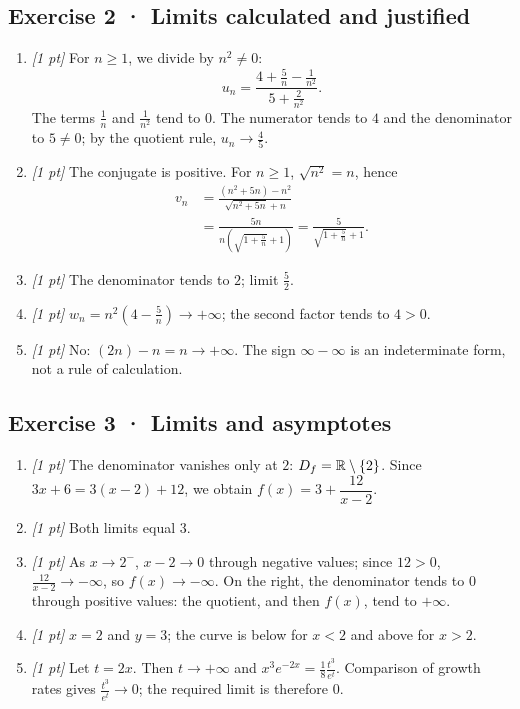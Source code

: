 \subsection*{Exercise 2 · Limits calculated and justified}\begin{enumerate}

\item \textit{[1 pt]} For $n\ge1$, we divide by $n^2\ne0$:
\[u_n=\frac{4+\frac{5}{n}-\frac{1}{n^2}}{5+\frac{2}{n^2}}.\]
The terms $\frac{1}{n}$ and $\frac{1}{n^2}$ tend to $0$. The numerator tends to $4$ and the denominator to $5\ne0$; by the quotient rule, $u_n\to\frac{4}{5}$.

\item \textit{[1 pt]} The conjugate is positive. For $n\ge1$, $\sqrt{n^2}=n$, hence
\[\begin{aligned}v_n&=\frac{(n^2+5n)-n^2}{\sqrt{n^2+5n}+n}\\&=\frac{5n}{n(\sqrt{1+\frac{5}{n}}+1)}=\frac{5}{\sqrt{1+\frac{5}{n}}+1}.\end{aligned}\]

\item \textit{[1 pt]} The denominator tends to $2$; limit $\frac{5}{2}$.

\item \textit{[1 pt]} $w_n=n^2(4-\frac{5}{n})\to+\infty$; the second factor tends to $4>0$.

\item \textit{[1 pt]} No: $(2n)-n=n\to+\infty$. The sign $\infty-\infty$ is an indeterminate form, not a rule of calculation.

\end{enumerate}

\subsection*{Exercise 3 · Limits and asymptotes}\begin{enumerate}

\item \textit{[1 pt]} The denominator vanishes only at $2$: $D_f=\mathbb R\setminus\{2\}$. Since $3x+6=3(x-2)+12$, we obtain $f(x)=3+\dfrac{12}{x-2}$.

\item \textit{[1 pt]} Both limits equal $3$.

\item \textit{[1 pt]} As $x\to 2^-$, $x-2\to0$ through negative values; since $12>0$, $\frac{12}{x-2}\to-\infty$, so $f(x)\to-\infty$. On the right, the denominator tends to $0$ through positive values: the quotient, and then $f(x)$, tend to $+\infty$.

\item \textit{[1 pt]} $x=2$ and $y=3$; the curve is below for $x<2$ and above for $x>2$.

\item \textit{[1 pt]} Let $t=2x$. Then $t\to+\infty$ and $x^3e^{-2x}=\frac{1}{8}\frac{t^3}{e^t}$. Comparison of growth rates gives $\frac{t^3}{e^t}\to0$; the required limit is therefore $0$.

\end{enumerate}

